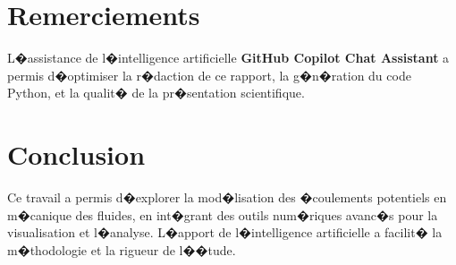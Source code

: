 \documentclass[12pt,a4paper]{article}
\begin{document}
\section*{Remerciements}
L�assistance de l�intelligence artificielle \textbf{GitHub Copilot Chat Assistant} a permis d�optimiser la r�daction de ce rapport, la g�n�ration du code Python, et la qualit� de la pr�sentation scientifique.
\section{Conclusion}
Ce travail a permis d�explorer la mod�lisation des �coulements potentiels en m�canique des fluides, en int�grant des outils num�riques avanc�s pour la visualisation et l�analyse. L�apport de l�intelligence artificielle a facilit� la m�thodologie et la rigueur de l��tude.
\end{document}
